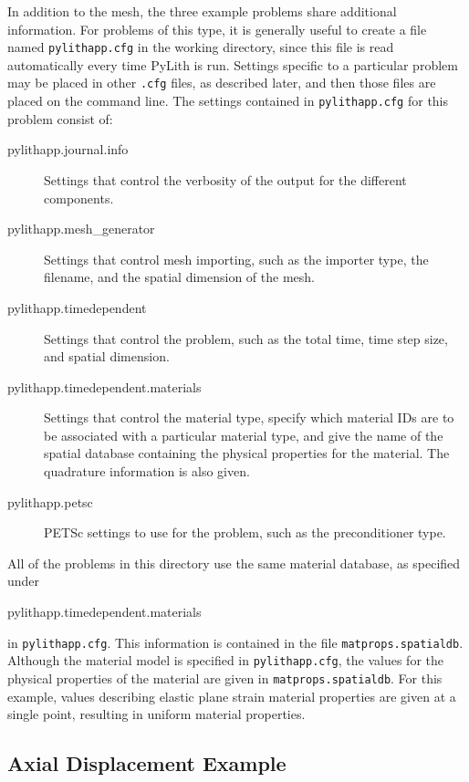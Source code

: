 In addition to the mesh, the three example problems share additional
information. For problems of this type, it is generally useful to
create a file named \texttt{pylithapp.cfg} in the working directory,
since this file is read automatically every time PyLith is run. Settings
specific to a particular problem may be placed in other \texttt{.cfg}
files, as described later, and then those files are placed on the
command line. The settings contained in \texttt{pylithapp.cfg} for
this problem consist of:
\begin{description}
\item [{pylithapp.journal.info}] Settings that control the verbosity of
the output for the different components.
\item [{pylithapp.mesh\_generator}] Settings that control mesh importing,
such as the importer type, the filename, and the spatial dimension
of the mesh.
\item [{pylithapp.timedependent}] Settings that control the problem, such
as the total time, time step size, and spatial dimension.
\item [{pylithapp.timedependent.materials}] Settings that control the material
type, specify which material IDs are to be associated with a particular
material type, and give the name of the spatial database containing
the physical  properties for the material. The quadrature information
is also given.
\item [{pylithapp.petsc}] PETSc settings to use for the problem, such as
the preconditioner type.
\end{description}
All of the problems in this directory use the same material database,
as specified under 
\begin{lyxcode}
pylithapp.timedependent.materials~
\end{lyxcode}
in \texttt{pylithapp.cfg}. This information is contained in the file
\texttt{matprops.spatialdb}. Although the material model is specified
in \texttt{pylithapp.cfg}, the values for the physical properties
of the material are given in \texttt{matprops.spatialdb}. For this
example, values describing elastic plane strain material properties
are given at a single point, resulting in uniform material properties.


\subsection{Axial Displacement Example}

